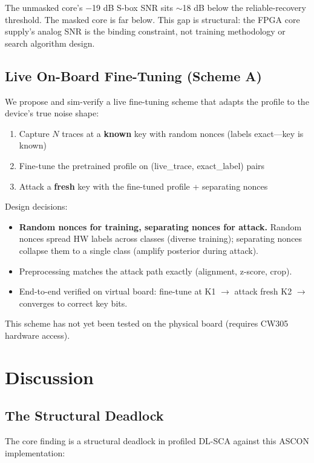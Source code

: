 \documentclass[a4paper,11pt,twocolumn]{article}
\begin{document}
The unmasked core's $-$19 dB S-box SNR sits $\sim$18 dB below the reliable-recovery threshold. The masked core is far below. This gap is structural: the FPGA core supply's analog SNR is the binding constraint, not training methodology or search algorithm design.

\subsection{Live On-Board Fine-Tuning (Scheme A)}

We propose and sim-verify a live fine-tuning scheme that adapts the profile to the device's true noise shape:

\begin{enumerate}[leftmargin=*,nosep]
\item Capture $N$ traces at a \textbf{known} key with random nonces (labels exact---key is known)
\item Fine-tune the pretrained profile on (live\_trace, exact\_label) pairs
\item Attack a \textbf{fresh} key with the fine-tuned profile + separating nonces
\end{enumerate}

Design decisions:
\begin{itemize}[leftmargin=*,nosep]
\item \textbf{Random nonces for training, separating nonces for attack.} Random nonces spread HW labels across classes (diverse training); separating nonces collapse them to a single class (amplify posterior during attack).
\item Preprocessing matches the attack path exactly (alignment, z-score, crop).
\item End-to-end verified on virtual board: fine-tune at K1 $\rightarrow$ attack fresh K2 $\rightarrow$ converges to correct key bits.
\end{itemize}

This scheme has not yet been tested on the physical board (requires CW305 hardware access).

\section{Discussion}

\subsection{The Structural Deadlock}

The core finding is a structural deadlock in profiled DL-SCA against this ASCON implementation:
\end{document}
